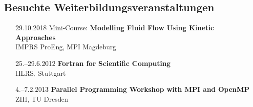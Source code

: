 \documentclass[oneside]{scrartcl}
\begin{document}
\subsection*{Besuchte Weiterbildungsveranstaltungen}
%
\begin{enumerate}
    \item[29.10.2018] Mini-Course: \textbf{Modelling Fluid Flow Using Kinetic Approaches}\\
                      IMPRS ProEng, MPI Magdeburg
    \item[25.--29.6.2012] \textbf{Fortran for Scientific Computing}\\
                          HLRS, Stuttgart
    \item[4.--7.2.2013] \textbf{Parallel Programming Workshop with MPI and OpenMP}\\
                  ZIH, TU Dresden
\end{enumerate}
\end{document}
